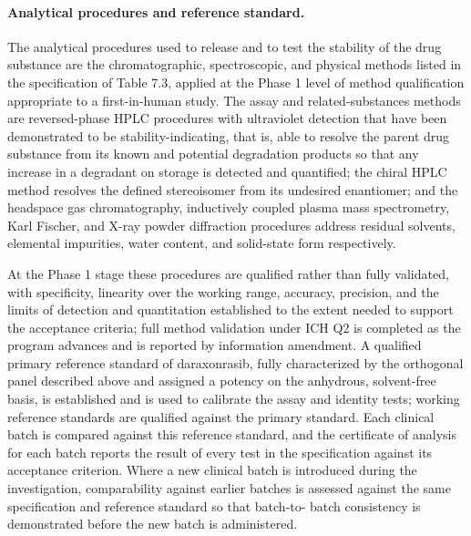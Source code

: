 \paragraph{Analytical procedures and reference standard.}
The analytical procedures used to release and to test the stability of the drug
substance are the chromatographic, spectroscopic, and physical methods listed in
the specification of Table 7.3, applied at the Phase 1 level of method
qualification appropriate to a first-in-human study. The assay and
related-substances methods are reversed-phase HPLC procedures with ultraviolet
detection that have been demonstrated to be stability-indicating, that is, able to
resolve the parent drug substance from its known and potential degradation
products so that any increase in a degradant on storage is detected and
quantified; the chiral HPLC method resolves the defined stereoisomer from its
undesired enantiomer; and the headspace gas chromatography, inductively coupled
plasma mass spectrometry, Karl Fischer, and X-ray powder diffraction procedures
address residual solvents, elemental impurities, water content, and solid-state
form respectively. 

At the Phase 1 stage these procedures are qualified rather than
fully validated, with specificity, linearity over the working range, accuracy,
precision, and the limits of detection and quantitation established to the extent
needed to support the acceptance criteria; full method validation under ICH Q2 is
completed as the program advances and is reported by information amendment. A
qualified primary reference standard of daraxonrasib, fully characterized by the
orthogonal panel described above and assigned a potency on the anhydrous,
solvent-free basis, is established and is used to calibrate the assay and identity
tests; working reference standards are qualified against the primary standard.
Each clinical batch is compared against this reference standard, and the
certificate of analysis for each batch reports the result of every test in the
specification against its acceptance criterion. Where a new clinical batch is
introduced during the investigation, comparability against earlier batches is
assessed against the same specification and reference standard so that batch-to-
batch consistency is demonstrated before the new batch is administered.


